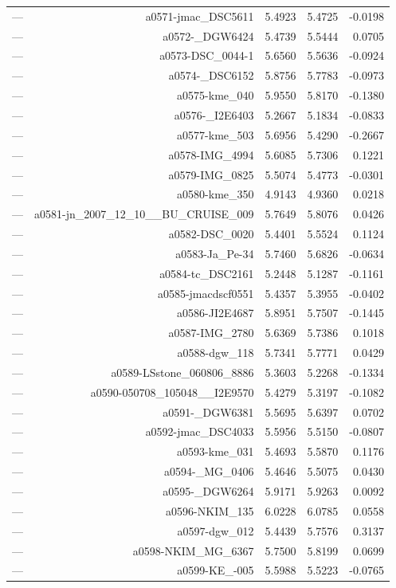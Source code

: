 \begin{table}[htbp]
\begin{tabular}{lrrrr}
— & a0571-jmac_DSC5611 & 5.4923 & 5.4725 & -0.0198 \\
— & a0572-_DGW6424 & 5.4739 & 5.5444 & 0.0705 \\
— & a0573-DSC_0044-1 & 5.6560 & 5.5636 & -0.0924 \\
— & a0574-_DSC6152 & 5.8756 & 5.7783 & -0.0973 \\
— & a0575-kme_040 & 5.9550 & 5.8170 & -0.1380 \\
— & a0576-_I2E6403 & 5.2667 & 5.1834 & -0.0833 \\
— & a0577-kme_503 & 5.6956 & 5.4290 & -0.2667 \\
— & a0578-IMG_4994 & 5.6085 & 5.7306 & 0.1221 \\
— & a0579-IMG_0825 & 5.5074 & 5.4773 & -0.0301 \\
— & a0580-kme_350 & 4.9143 & 4.9360 & 0.0218 \\
— & a0581-jn_2007_12_10__BU_CRUISE_009 & 5.7649 & 5.8076 & 0.0426 \\
— & a0582-DSC_0020 & 5.4401 & 5.5524 & 0.1124 \\
— & a0583-Ja_Pe-34 & 5.7460 & 5.6826 & -0.0634 \\
— & a0584-tc_DSC2161 & 5.2448 & 5.1287 & -0.1161 \\
— & a0585-jmacdscf0551 & 5.4357 & 5.3955 & -0.0402 \\
— & a0586-JI2E4687 & 5.8951 & 5.7507 & -0.1445 \\
— & a0587-IMG_2780 & 5.6369 & 5.7386 & 0.1018 \\
— & a0588-dgw_118 & 5.7341 & 5.7771 & 0.0429 \\
— & a0589-LSstone_060806_8886 & 5.3603 & 5.2268 & -0.1334 \\
— & a0590-050708_105048__I2E9570 & 5.4279 & 5.3197 & -0.1082 \\
— & a0591-_DGW6381 & 5.5695 & 5.6397 & 0.0702 \\
— & a0592-jmac_DSC4033 & 5.5956 & 5.5150 & -0.0807 \\
— & a0593-kme_031 & 5.4693 & 5.5870 & 0.1176 \\
— & a0594-_MG_0406 & 5.4646 & 5.5075 & 0.0430 \\
— & a0595-_DGW6264 & 5.9171 & 5.9263 & 0.0092 \\
— & a0596-NKIM_135 & 6.0228 & 6.0785 & 0.0558 \\
— & a0597-dgw_012 & 5.4439 & 5.7576 & 0.3137 \\
— & a0598-NKIM_MG_6367 & 5.7500 & 5.8199 & 0.0699 \\
— & a0599-KE_-005 & 5.5988 & 5.5223 & -0.0765 \\

\end{tabular}
\end{table}
